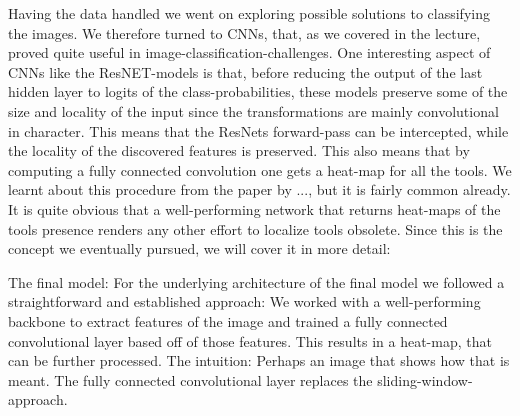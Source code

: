 Having the data handled we went on exploring possible solutions to classifying the images. We therefore turned to CNNs, that, as we covered in the lecture, proved quite useful in image-classification-challenges. One interesting aspect of CNNs like the ResNET-models is that, before reducing the output of the last hidden layer to logits of the class-probabilities, these models preserve some of the size and locality of the input since the transformations are mainly convolutional in character. This means that the ResNets forward-pass can be intercepted, while the locality of the discovered features is preserved.
This also means that by computing a fully connected convolution one gets a heat-map for all the tools. We learnt about this procedure from the paper by ..., but it is fairly common already. It is quite obvious that a well-performing network that returns heat-maps of the tools presence renders any other effort to localize tools obsolete. Since this is the concept we eventually pursued, we will cover it in more detail:

The final model:
For the underlying architecture of the final model we followed a straightforward and established approach: We worked with a well-performing backbone to extract features of the image and trained a fully connected convolutional layer based off of those features. This results in a heat-map, that can be further processed.
		The intuition: Perhaps an image that shows how that is meant.
The fully connected convolutional layer replaces the sliding-window-approach. 

